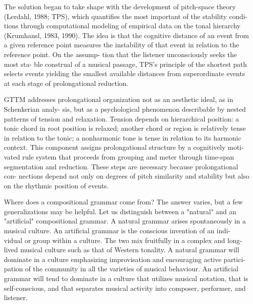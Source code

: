 \documentclass[
	12pt,				%
	openright,			%
	twoside,			%
	a4paper,			%
	english,			%
	french,				%
	spanish,			%
	brazil				%
	]{abntex2}
\begin{document}
The solution began to take shape with the development
of pitch-space theory (Lerdahl, 1988; TPS), which
quantifies the most important of the stability condi-
tions through computational modeling of empirical
data on the tonal hierarchy (Krumhansl, 1983, 1990).
The idea is that the cognitive distance of an event from
a given reference point measures the instability of that
event in relation to the reference point. On the assump-
tion that the listener unconsciously seeks the most sta-
ble construal of a musical passage, TPS’s principle of
the shortest path selects events yielding the smallest
available distances from superordinate events at each
stage of prolongational reduction.
\cite[p. 191]{lerdahl2009genesis}


GTTM addresses prolongational organization not as an aesthetic ideal, as in Schenkerian analy-
sis, but as a psychological phenomenon describable by
nested patterns of tension and relaxation. Tension depends
on hierarchical position: a tonic chord in root position
is relaxed; another chord or region is relatively tense in
relation to the tonic; a nonharmonic tone is tense in
relation to its harmonic context. This component
assigns prolongational structure by a cognitively moti-
vated rule system that proceeds from grouping and
meter through time-span segmentation and reduction.
These steps are necessary because prolongational con-
nections depend not only on degrees of pitch similarity
and stability but also on the rhythmic position of events.
\cite{lerdahl2009genesis}

Where does a compositional grammar come from? The answer varies, but a few
generalizations may be helpful. Let us distinguish between a "natural" and an
"artificial" compositional grammar. A natural grammar arises spontaneously in
a musical culture. An artificial grammar is the conscious invention of an indi-
vidual or group within a culture. The two mix fruitfully in a complex and long-
lived musical culture such as that of Western tonality. A natural grammar will
dominate in a culture emphasizing improvisation and encouraging active partici-
pation of the community in all the varieties of musical behaviour. An artificial
grammar will tend to dominate in a culture that utilizes musical notation, that is
self-conscious, and that separates musical activity into composer, performer,
and listener.
\cite[p. 100-101]{lerdahl1992cognitive}
\end{document}
